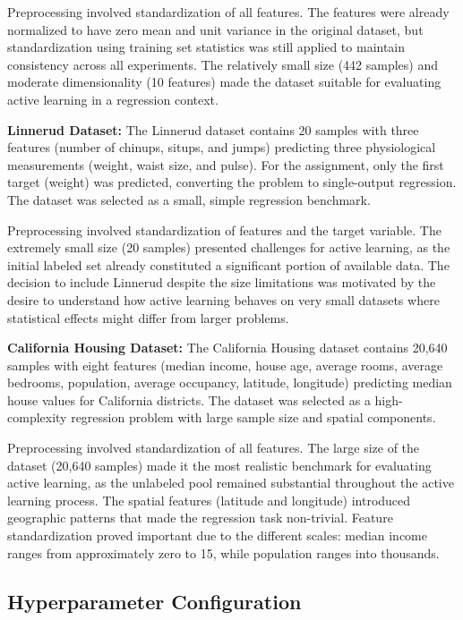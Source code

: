\documentclass[conference]{IEEEtran}
\begin{document}
Preprocessing involved standardization of all features. The features were already normalized to have zero mean and unit variance in the original dataset, but standardization using training set statistics was still applied to maintain consistency across all experiments. The relatively small size (442 samples) and moderate dimensionality (10 features) made the dataset suitable for evaluating active learning in a regression context.

\textbf{Linnerud Dataset:}
The Linnerud dataset contains 20 samples with three features (number of chinups, situps, and jumps) predicting three physiological measurements (weight, waist size, and pulse). For the assignment, only the first target (weight) was predicted, converting the problem to single-output regression. The dataset was selected as a small, simple regression benchmark.

Preprocessing involved standardization of features and the target variable. The extremely small size (20 samples) presented challenges for active learning, as the initial labeled set already constituted a significant portion of available data. The decision to include Linnerud despite the size limitations was motivated by the desire to understand how active learning behaves on very small datasets where statistical effects might differ from larger problems.

\textbf{California Housing Dataset:}
The California Housing dataset contains 20,640 samples with eight features (median income, house age, average rooms, average bedrooms, population, average occupancy, latitude, longitude) predicting median house values for California districts. The dataset was selected as a high-complexity regression problem with large sample size and spatial components.

Preprocessing involved standardization of all features. The large size of the dataset (20,640 samples) made it the most realistic benchmark for evaluating active learning, as the unlabeled pool remained substantial throughout the active learning process. The spatial features (latitude and longitude) introduced geographic patterns that made the regression task non-trivial. Feature standardization proved important due to the different scales: median income ranges from approximately zero to 15, while population ranges into thousands.

\subsection{Hyperparameter Configuration}
\end{document}
